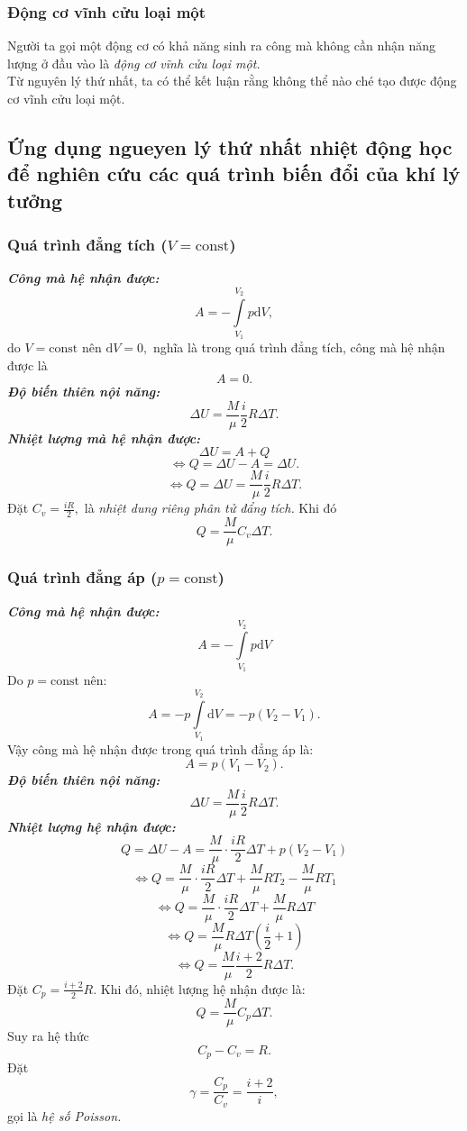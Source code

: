 \subsubsection{Động cơ vĩnh cửu loại một}
Người ta gọi một động cơ có khả năng sinh ra công mà không cần nhận năng lượng ở đầu vào là \textit{động cơ vĩnh cửu loại một.}\\
Từ nguyên lý thứ nhất, ta có thể kết luận rằng không thể nào ché tạo được động cơ vĩnh cửu loại một.
\subsection{Ứng dụng ngueyen lý thứ nhất nhiệt động học để nghiên cứu các quá trình biến đổi của khí lý tưởng}
\subsubsection{Quá trình đẳng tích ($V = \mathrm{const}$)}
\textit{\textbf{Công mà hệ nhận được:}}
$$A =  - \int\limits_{{V_1}}^{{V_2}} {p \mathrm{d} V} ,$$
do $V = \mathrm{const}$ nên $\mathrm{d}V = 0,$ nghĩa là trong quá trình đẳng tích, công mà hệ nhận được là 
$$A = 0.$$
\textit{\textbf{Độ biến thiên nội năng:}}
$$ \Delta U = \frac{M}{\mu} \frac{i}{2} R \Delta T.$$
\textit{\textbf{Nhiệt lượng mà hệ nhận được:}}
$$\Delta U = A + Q$$
$$\Leftrightarrow Q = \Delta U - A = \Delta U.$$
$$\Leftrightarrow Q = \Delta U = \frac{M}{\mu} \frac{i}{2} R \Delta T.$$
Đặt $C_v = \frac{iR}{2},$  là \textit{nhiệt dung riêng phân tử đẩng tích.} Khi đó
$$Q = \frac{M}{\mu} C_v \Delta T.$$
\subsubsection{Quá trình đẳng áp ($p = \mathrm{const}$)}
\textbf{\textit{Công mà hệ nhận được:}}
$$A =  - \int\limits_{{V_1}}^{{V_2}} {p\mathrm{d}V} $$
Do $p = \mathrm{const}$ nên: 
$$A =  - p\int\limits_{{V_1}}^{{V_2}} {\mathrm{d}V}  =  - p\left( {{V_2} - {V_1}} \right).$$
Vậy công mà hệ nhận được trong quá trình đẳng áp là:
$$A = p \left( {V_1 - V_2} \right).$$
\textbf{\textit{Độ biến thiên nội năng:}}
$$ \Delta U = \frac{M}{\mu} \frac{i}{2} R \Delta T.$$
\textbf{\textit{Nhiệt lượng hệ nhận được:}}
$$Q = \Delta U - A = \frac{M}{\mu } \cdot \frac{{iR}}{2}\Delta T + p\left( {{V_2} - {V_1}} \right)$$
$$ \Leftrightarrow Q = \frac{M}{\mu } \cdot \frac{{iR}}{2}\Delta T + \frac{M}{\mu }R{T_2} - \frac{M}{\mu }R{T_1}$$
$$ \Leftrightarrow Q = \frac{M}{\mu } \cdot \frac{{iR}}{2}\Delta T + \frac{M}{\mu }R\Delta T$$
$$ \Leftrightarrow Q = \frac{M}{\mu }R\Delta T\left( {\frac{i}{2} + 1} \right)$$
$$ \Leftrightarrow Q = \frac{M}{\mu }\frac{{i + 2}}{2}R\Delta T.$$
Đặt $C_p = \frac{i + 2}{2} R.$ Khi đó, nhiệt lượng hệ nhận được là:
$$Q = \frac{M}{\mu }{C_p}\Delta T.$$
Suy ra hệ thức $$C_p - C_v = R.$$
Đặt 
$$\gamma = \frac{C_p}{C_v} = \frac{i + 2}{i},$$
gọi là \textit{hệ số Poisson.}
